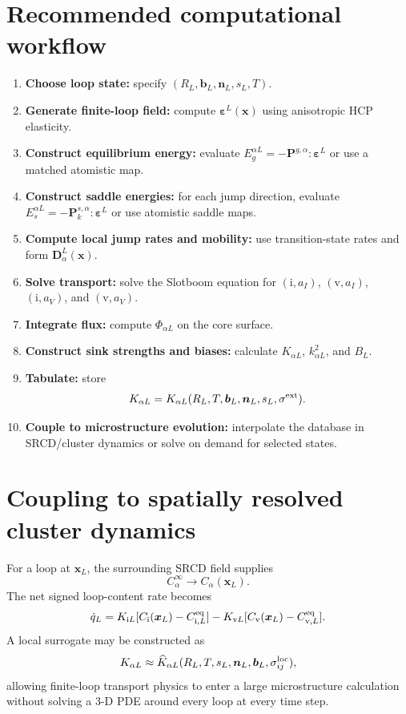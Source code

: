 \documentclass[11pt]{article}
\newcommand{\ii}{\mathrm i}
\newcommand{\vv}{\mathrm v}
\newcommand{\bD}{\bm{D}}
\newcommand{\bP}{\bm{P}}
\newcommand{\beps}{\bm{\varepsilon}}
\newcommand{\bx}{\bm{x}}
\newcommand{\bn}{\bm{n}}
\newcommand{\bb}{\bm{b}}
\begin{document}
\section{Recommended computational workflow}
\begin{enumerate}
\item \textbf{Choose loop state:} specify $(R_L,\bb_L,\bn_L,s_L,T)$.
\item \textbf{Generate finite-loop field:} compute $\beps^L(\bx)$ using anisotropic HCP elasticity.
\item \textbf{Construct equilibrium energy:} evaluate $E_g^{\alpha L}=-\bP^{g,\alpha}:\beps^L$ or use a matched atomistic map.
\item \textbf{Construct saddle energies:} for each jump direction, evaluate $E_s^{\alpha L}=-\bP_k^{s,\alpha}:\beps^L$ or use atomistic saddle maps.
\item \textbf{Compute local jump rates and mobility:} use transition-state rates and form $\bD_\alpha^L(\bx)$.
\item \textbf{Solve transport:} solve the Slotboom equation for $(\ii,a_I)$, $(\vv,a_I)$, $(\ii,a_V)$, and $(\vv,a_V)$.
\item \textbf{Integrate flux:} compute $\Phi_{\alpha L}$ on the core surface.
\item \textbf{Construct sink strengths and biases:} calculate $K_{\alpha L}$, $k_{\alpha L}^2$, and $B_L$.
\item \textbf{Tabulate:} store
\begin{equation}
K_{\alpha L}=K_{\alpha L}(R_L,T,\bb_L,\bn_L,s_L,\sigma^{\rm ext}).
\end{equation}
\item \textbf{Couple to microstructure evolution:} interpolate the database in SRCD/cluster dynamics or solve on demand for selected states.
\end{enumerate}

\section{Coupling to spatially resolved cluster dynamics}
For a loop at $\bx_L$, the surrounding SRCD field supplies
\begin{equation}
C_\alpha^\infty\rightarrow C_\alpha(\bx_L).
\end{equation}
The net signed loop-content rate becomes
\begin{equation}
\dot q_L=K_{\ii L}[C_\ii(\bx_L)-C_{\ii,L}^{\rm eq}]
-K_{\vv L}[C_\vv(\bx_L)-C_{\vv,L}^{\rm eq}].
\end{equation}
A local surrogate may be constructed as
\begin{equation}
K_{\alpha L}\approx\widehat K_{\alpha L}(R_L,T,s_L,\bn_L,\bb_L,\sigma_{ij}^{\rm loc}),
\end{equation}
allowing finite-loop transport physics to enter a large microstructure calculation without solving a 3-D PDE around every loop at every time step.
\end{document}
